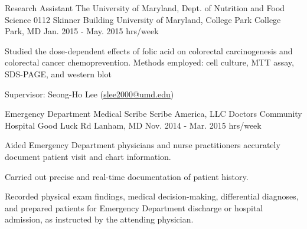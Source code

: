 \begin{cventries}

  \cventry
    {Research Assistant} %
    {The University of Maryland, Dept. of Nutrition and Food Science} %
    {0112 Skinner Building \newline
University of Maryland, College Park \newline
College Park, MD} %
    {Jan. 2015 - May. 2015  hrs/week} %
    {
      \begin{cvitems} %
        \item {Studied the dose-dependent effects of folic acid on colorectal carcinogenesis and colorectal cancer chemoprevention. Methods employed: cell culture, MTT assay, SDS-PAGE, and western blot}
        \item{Supervisor: Seong-Ho Lee (\textcolor{navyblue}{
        {\underline{\href{mailto:slee2000@umd.edu}{slee2000@umd.edu}}}})}
      \end{cvitems}
    }


  \cventry
    {Emergency Department Medical Scribe} %
    {Scribe America, LLC } %
    {Doctors Community Hospital  Good Luck Rd \newline
Lanham, MD
} %
    {Nov. 2014 - Mar. 2015  hrs/week} %
    {
      \begin{cvitems} %
        \item {Aided Emergency Department physicians and nurse practitioners accurately document patient visit and chart information.}
        \item{Carried out precise and real-time documentation of patient history.}
        \item{Recorded physical exam findings, medical decision-making, differential diagnoses, and prepared patients for Emergency Department discharge or hospital admission, as instructed by the attending physician.}
      \end{cvitems}
    }




\end{cventries}
